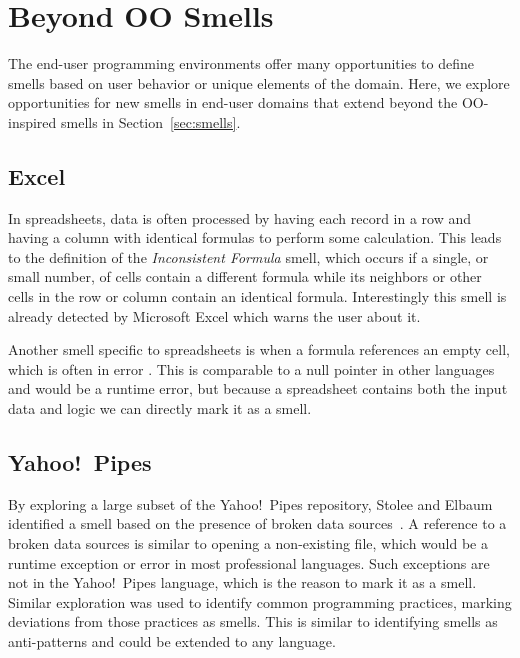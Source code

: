 \documentclass{sig-alternate}
\begin{document}
\section{Beyond OO Smells}
\label{sec:beyond}

\label{sec:smells:domain}
The end-user programming environments offer many opportunities to define smells based on user behavior or unique elements of the domain. Here, we explore opportunities for new smells in end-user domains that extend beyond the OO-inspired smells in Section~\ref{sec:smells}. 

\subsection{Excel}
In spreadsheets, data is often processed by having each record in a row and having a column with identical formulas to perform some calculation.
This leads to the definition of the \emph{Inconsistent Formula} smell, which occurs if a single, or small number, of cells contain a different formula while its neighbors or other cells in the row or column contain an identical formula.
Interestingly this smell is already detected by Microsoft Excel which warns the user about it.

Another smell specific to spreadsheets is when a formula references an empty cell, which is often in error \cite{cunha2012towards}.
This is comparable to a null pointer in other languages and would be a runtime error, but because a spreadsheet contains both the input data and logic we can directly mark it as a smell.

\subsection{Yahoo!\ Pipes}
By exploring a large subset of the Yahoo!\ Pipes repository, Stolee and Elbaum identified a smell based on the presence of broken data sources~\cite{StoleeTSE2013}.
A reference to a broken data sources  is similar to opening a non-existing file, which would be a runtime exception or error in most professional languages.
Such exceptions are not in the Yahoo!\ Pipes language, which is the reason to mark it as a smell. 
Similar exploration was used to  identify common programming practices, marking deviations from those practices as smells. 
This is similar to identifying  smells  as anti-patterns  and could be extended to any language. 
\end{document}
